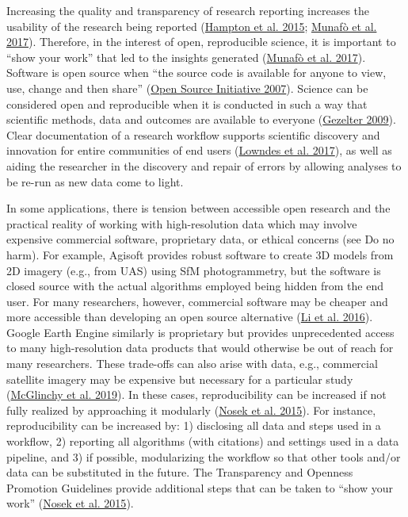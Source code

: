 \documentclass[
  12pt,
]{article}
\begin{document}
Increasing the quality and transparency of research reporting increases
the usability of the research being reported
(\protect\hyperlink{ref-hampton2015tao}{Hampton et al. 2015};
\protect\hyperlink{ref-munafo2017manifesto}{Munafò et al. 2017}).
Therefore, in the interest of open, reproducible science, it is
important to ``show your work'' that led to the insights generated
(\protect\hyperlink{ref-munafo2017manifesto}{Munafò et al. 2017}).
Software is open source when ``the source code is available for anyone
to view, use, change and then share''
(\protect\hyperlink{ref-osi2007}{Open Source Initiative 2007}). Science
can be considered open and reproducible when it is conducted in such a
way that scientific methods, data and outcomes are available to everyone
(\protect\hyperlink{ref-gezelter2009}{Gezelter 2009}). Clear
documentation of a research workflow supports scientific discovery and
innovation for entire communities of end users
(\protect\hyperlink{ref-lowndes2017our}{Lowndes et al. 2017}), as well
as aiding the researcher in the discovery and repair of errors by
allowing analyses to be re-run as new data come to light.

In some applications, there is tension between accessible open research
and the practical reality of working with high-resolution data which may
involve expensive commercial software, proprietary data, or ethical
concerns (see Do no harm). For example, Agisoft provides robust software
to create 3D models from 2D imagery (e.g., from UAS) using SfM
photogrammetry, but the software is closed source with the actual
algorithms employed being hidden from the end user. For many
researchers, however, commercial software may be cheaper and more
accessible than developing an open source alternative
(\protect\hyperlink{ref-quan2016construction}{Li et al. 2016}). Google
Earth Engine similarly is proprietary but provides unprecedented access
to many high-resolution data products that would otherwise be out of
reach for many researchers. These trade-offs can also arise with data,
e.g., commercial satellite imagery may be expensive but necessary for a
particular study
(\protect\hyperlink{ref-mcglinchy2019application}{McGlinchy et al.
2019}). In these cases, reproducibility can be increased if not fully
realized by approaching it modularly
(\protect\hyperlink{ref-nosek2015}{Nosek et al. 2015}). For instance,
reproducibility can be increased by: 1) disclosing all data and steps
used in a workflow, 2) reporting all algorithms (with citations) and
settings used in a data pipeline, and 3) if possible, modularizing the
workflow so that other tools and/or data can be substituted in the
future. The Transparency and Openness Promotion Guidelines provide
additional steps that can be taken to ``show your work''
(\protect\hyperlink{ref-nosek2015}{Nosek et al. 2015}).
\end{document}
